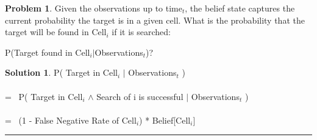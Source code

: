 \documentclass{article}
\theoremstyle{definition}
\newtheorem{problem}{Problem}
\def\fline{\rule{0.75\linewidth}{0.5pt}}
\newcommand{\finishline}{\vspace{-15pt}\begin{center}\fline\end{center}}
\newtheorem*{solution*}{Solution}
\newenvironment{solution}{\begin{solution*}}{{\finishline} \end{solution*}}
\begin{document}
\smallskip

\begin{problem}
Given the observations up to time$_{t}$, the belief state captures the current probability the target is in a given cell.  What is the probability that the target will be found in Cell$_{i}$ if it is searched:
\begin{center}
P(Target found in Cell$_{i}$$|$Observations$_{t}$)?
\end{center}
\end{problem}
\smallskip
\begin{solution}
P( Target in Cell$_{i}$ $|$ Observations$_{t}$ )
\\\\
= \ P( Target in Cell$_{i}$ $\land$ Search of i is successful $|$ Observations$_{t}$ )
\\\\
= \ (1 - False Negative Rate of Cell$_{i}$) * Belief[Cell$_{i}$]
\end{solution}

\smallskip
\end{document}
